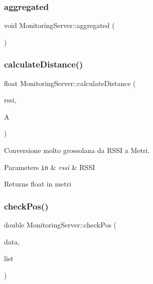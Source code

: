 \mbox{\label{class_monitoring_server_af90198642c809ec801d07afa789a6869}} 
\subsubsection{\texorpdfstring{aggregated}{aggregated}}
{\footnotesize\ttfamily void Monitoring\+Server\+::aggregated (\begin{DoxyParamCaption}{ }\end{DoxyParamCaption})\hspace{0.3cm}{\ttfamily [signal]}}

\mbox{\label{class_monitoring_server_a34a8e8240fa207c0be29ba9bd2906d78}} 
\subsubsection{\texorpdfstring{calculate\+Distance()}{calculateDistance()}}
{\footnotesize\ttfamily float Monitoring\+Server\+::calculate\+Distance (\begin{DoxyParamCaption}\item[{signed}]{rssi,  }\item[{int}]{A }\end{DoxyParamCaption})}



Conversione molto grossolana da R\+S\+SI a Metri. 


\begin{DoxyParams}[1]{Parameters}
\mbox{\tt in}  & {\em rssi} & R\+S\+SI\\
\hline
\end{DoxyParams}
\begin{DoxyReturn}{Returns}
float in metri 
\end{DoxyReturn}
\mbox{\label{class_monitoring_server_a1e9a9e70156471a2fdc73d3bdadbd308}} 
\subsubsection{\texorpdfstring{check\+Pos()}{checkPos()}}
{\footnotesize\ttfamily double Monitoring\+Server\+::check\+Pos (\begin{DoxyParamCaption}\item[{\hyperlink{class_position_data}{Position\+Data}}]{data,  }\item[{std\+::list$<$ \hyperlink{class_position_data}{Position\+Data} $>$}]{list }\end{DoxyParamCaption})}


